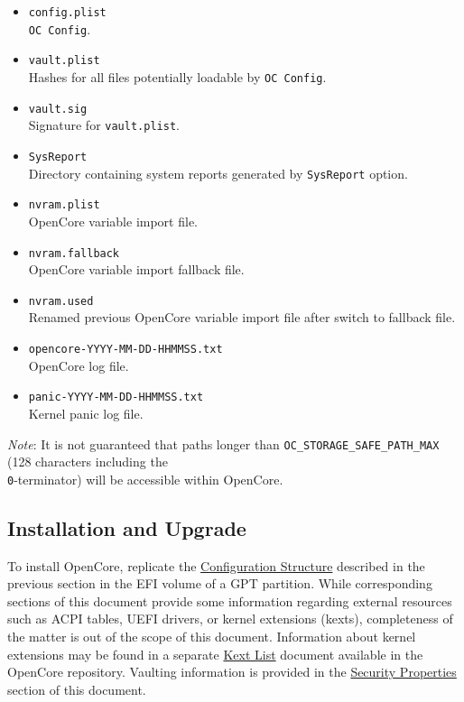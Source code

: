 \documentclass[]{article}
\begin{document}
\begin{itemize}
  directly or through a custom launcher however, other directories containing
  \texttt{OpenCore.efi} files are also supported.
\item
  \texttt{config.plist} \\
  \texttt{OC Config}.
\item
  \texttt{vault.plist} \\
  Hashes for all files potentially loadable by \texttt{OC Config}.
\item
  \texttt{vault.sig} \\
  Signature for \texttt{vault.plist}.
\item
  \texttt{SysReport} \\
  Directory containing system reports generated by \texttt{SysReport} option.
\item
  \texttt{nvram.plist} \\
  OpenCore variable import file.
\item
  \texttt{nvram.fallback} \\
  OpenCore variable import fallback file.
\item
  \texttt{nvram.used} \\
  Renamed previous OpenCore variable import file after switch to fallback file.
\item
  \texttt{opencore-YYYY-MM-DD-HHMMSS.txt} \\
  OpenCore log file.
\item
  \texttt{panic-YYYY-MM-DD-HHMMSS.txt} \\
  Kernel panic log file.
\end{itemize}

\emph{Note}: It is not guaranteed that paths longer than
\texttt{OC\_STORAGE\_SAFE\_PATH\_MAX} (128 characters including
the \texttt{\\0}-terminator) will be accessible within OpenCore.

\subsection{Installation and Upgrade}\label{configuration-install}

To install OpenCore, replicate the
\hyperref[configuration-structure]{Configuration Structure} described
in the previous section in the EFI volume of a GPT partition. While
corresponding sections of this document provide some information
regarding external resources such as ACPI tables, UEFI drivers,
or kernel extensions (kexts), completeness of the matter is out of
the scope of this document. Information about kernel extensions may
be found in a separate
\href{https://github.com/acidanthera/OpenCorePkg/blob/master/Docs/Kexts.md}{Kext List}
document available in the OpenCore repository. Vaulting information is provided in
the \hyperref[miscsecurityprops]{Security Properties} section of this document.
\end{document}
